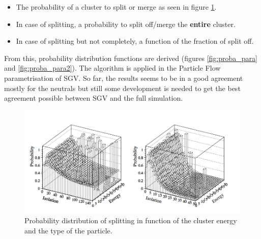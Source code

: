 \begin{itemize}
  \item The probability of a cluster to split or merge as seen in figure \ref{fig:proba_split}.
  \item In case of splitting, a probability to split off/merge the \textbf{entire} cluster.
  \item In case of splitting but not completely, a function of the fraction of split off.
\end{itemize}

From this, probability distribution functions are derived (figures \ref{fig:proba_para} and \ref{fig:proba_para2}). The algorithm is applied in the Particle Flow parametrisation of SGV. So far, the results seems to be in a good agreement mostly for the neutrals but still some development is needed to get the best agreement possible between SGV and the full simulation.

\begin{figure}[htbp!]
  \centering
  \includegraphics[width=1\linewidth]{Appendixes/fig_SGV/prob_split.png}
  \caption{Probability distribution of splitting in function of the cluster energy and the type of the particle.}
  \label{fig:proba_split}
\end{figure}

